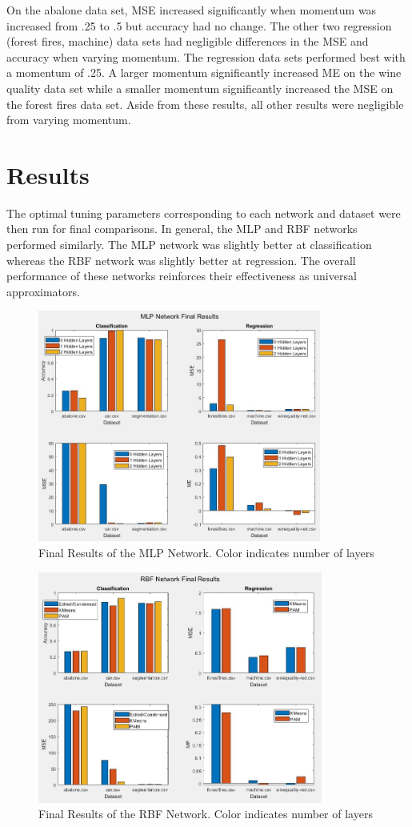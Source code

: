 \documentclass[twoside,10pt]{article}
\begin{document}
On the abalone data set, MSE increased significantly when momentum was increased from .25 to .5 but accuracy had no change. The other two regression (forest fires, machine) data sets had negligible differences in the MSE and accuracy when varying momentum. The regression data sets performed best with a momentum of .25. A larger momentum significantly increased ME on the wine quality data set while a smaller momentum significantly increased the MSE on the forest fires data set. Aside from these results, all other results were negligible from varying momentum.
\section{Results}

	The optimal tuning parameters corresponding to each network and dataset were then run for final comparisons. In general, the MLP and RBF networks performed similarly. The MLP network was slightly better at classification whereas the RBF network was slightly better at regression. The overall performance of these networks reinforces their effectiveness as universal approximators.

\begin{figure}[h]
	\centering
	\includegraphics[height=3in]{FINAL_FIGS/MLP_FINAL.JPG}
	\caption{Final Results of the MLP Network. Color indicates number of layers}
\end{figure}
\begin{figure}[h]
	\centering
	\includegraphics[height=3in]{FINAL_FIGS/RBF_FINAL.JPG}
	\caption{Final Results of the RBF Network. Color indicates number of layers}
\end{figure}
\end{document}
